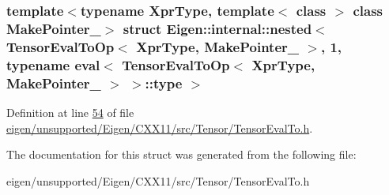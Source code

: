 \subsubsection*{template$<$typename Xpr\+Type, template$<$ class $>$ class Make\+Pointer\+\_\+$>$\newline
struct Eigen\+::internal\+::nested$<$ Tensor\+Eval\+To\+Op$<$ Xpr\+Type, Make\+Pointer\+\_\+ $>$, 1, typename eval$<$ Tensor\+Eval\+To\+Op$<$ Xpr\+Type, Make\+Pointer\+\_\+ $>$ $>$\+::type $>$}



Definition at line \hyperlink{eigen_2unsupported_2_eigen_2_c_x_x11_2src_2_tensor_2_tensor_eval_to_8h_source_l00054}{54} of file \hyperlink{eigen_2unsupported_2_eigen_2_c_x_x11_2src_2_tensor_2_tensor_eval_to_8h_source}{eigen/unsupported/\+Eigen/\+C\+X\+X11/src/\+Tensor/\+Tensor\+Eval\+To.\+h}.



The documentation for this struct was generated from the following file\+:\begin{DoxyCompactItemize}
\item 
eigen/unsupported/\+Eigen/\+C\+X\+X11/src/\+Tensor/\+Tensor\+Eval\+To.\+h\end{DoxyCompactItemize}
